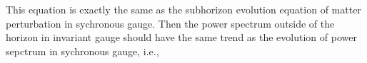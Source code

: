 \documentclass{article}
\begin{document}
This equation is exactly the same as the subhorizon evolution equation of matter perturbation in sychronous gauge. Then the power spectrum outside of the horizon in invariant gauge should have the same trend as the evolution of power sepctrum in sychronous gauge, i.e., 

\fi

\end{document}
